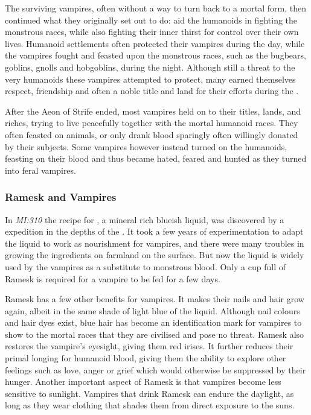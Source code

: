 The surviving vampires, often without a way to turn back to a mortal form,
then continued what they originally set out to do: aid the humanoids in
fighting the monstrous races, while also fighting their inner thirst for
control over their own lives. Humanoid settlements often protected their
vampires during the day, while the vampires fought and feasted upon the
monstrous races, such as the bugbears, goblins, gnolls and hobgoblins, during
the night. Although still a threat to the very humanoids these vampires
attempted to protect, many earned themselves respect, friendship and often a
noble title and land for their efforts during the .

After the Aeon of Strife ended, most vampires held on to their titles, lands,
and riches, trying to live peacefully together with the mortal humanoid races.
They often feasted on animals, or only drank blood sparingly often willingly
donated by their subjects. Some vampires however instead turned on the
humanoids, feasting on their blood and thus became hated, feared and hunted as
they turned into feral vampires.

\subsubsection{Ramesk and Vampires}

In \emph{MI:310} the recipe for , a mineral rich blueish
liquid, was discovered by a  expedition in the depths of
the . It took a few years of experimentation to
adapt the liquid to work as nourishment for vampires, and there were many
troubles in growing the ingredients on farmland on the surface. But now the
liquid is widely used by the vampires as a substitute to monstrous blood. Only
a cup full of Ramesk is required for a vampire to be fed for a few days.

Ramesk has a few other benefits for vampires. It makes their nails and hair
grow again, albeit in the same shade of light blue of the liquid. Although
nail colours and hair dyes exist, blue hair has become an identification mark
for vampires to show to the mortal races that they are civilised and pose no
threat. Ramesk also restores the vampire's eyesight, giving them red
irises. It further reduces their primal longing for humanoid blood, giving
them the ability to explore other feelings such as love, anger or grief which
would otherwise be suppressed by their hunger. Another important aspect of
Ramesk is that vampires become less sensitive to sunlight. Vampires that drink
Ramesk can endure the daylight, as long as they wear clothing that shades them
from direct exposure to the suns.

